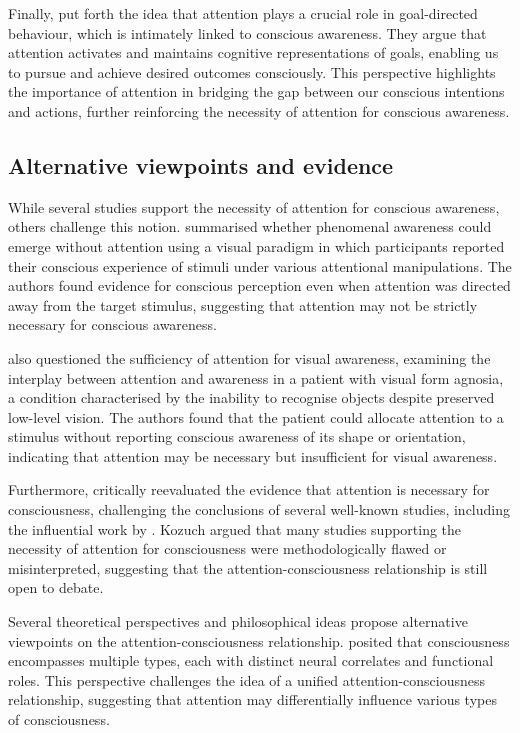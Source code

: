 \documentclass[10pt]{article}
\begin{document}
\begin{sloppypar}
  Finally, \cite{dijksterhuis_goals_2010} put forth the idea that attention plays a crucial role in goal-directed behaviour, which is intimately linked to conscious awareness. They argue that attention activates and maintains cognitive representations of goals, enabling us to pursue and achieve desired outcomes consciously. This perspective highlights the importance of attention in bridging the gap between our conscious intentions and actions, further reinforcing the necessity of attention for conscious awareness.

  \subsection{Alternative viewpoints and evidence}
  \label{sec:alternative}

  While several studies support the necessity of attention for conscious awareness, others challenge this notion. \cite{aru_phenomenal_2013} summarised whether phenomenal awareness could emerge without attention using a visual paradigm in which participants reported their conscious experience of stimuli under various attentional manipulations. The authors found evidence for conscious perception even when attention was directed away from the target stimulus, suggesting that attention may not be strictly necessary for conscious awareness.

  \cite{kentridge_attended_2008} also questioned the sufficiency of attention for visual awareness, examining the interplay between attention and awareness in a patient with visual form agnosia, a condition characterised by the inability to recognise objects despite preserved low-level vision. The authors found that the patient could allocate attention to a stimulus without reporting conscious awareness of its shape or orientation, indicating that attention may be necessary but insufficient for visual awareness.

  Furthermore, \cite{kozuch_gorillas_2018} critically reevaluated the evidence that attention is necessary for consciousness, challenging the conclusions of several well-known studies, including the influential work by \cite{cohen_attentional_2012}. Kozuch argued that many studies supporting the necessity of attention for consciousness were methodologically flawed or misinterpreted, suggesting that the attention-consciousness relationship is still open to debate.

  Several theoretical perspectives and philosophical ideas propose alternative viewpoints on the attention-consciousness relationship. \cite{montemayor_types_2021} posited that consciousness encompasses multiple types, each with distinct neural correlates and functional roles. This perspective challenges the idea of a unified attention-consciousness relationship, suggesting that attention may differentially influence various types of consciousness.


\end{sloppypar}
\end{document}
